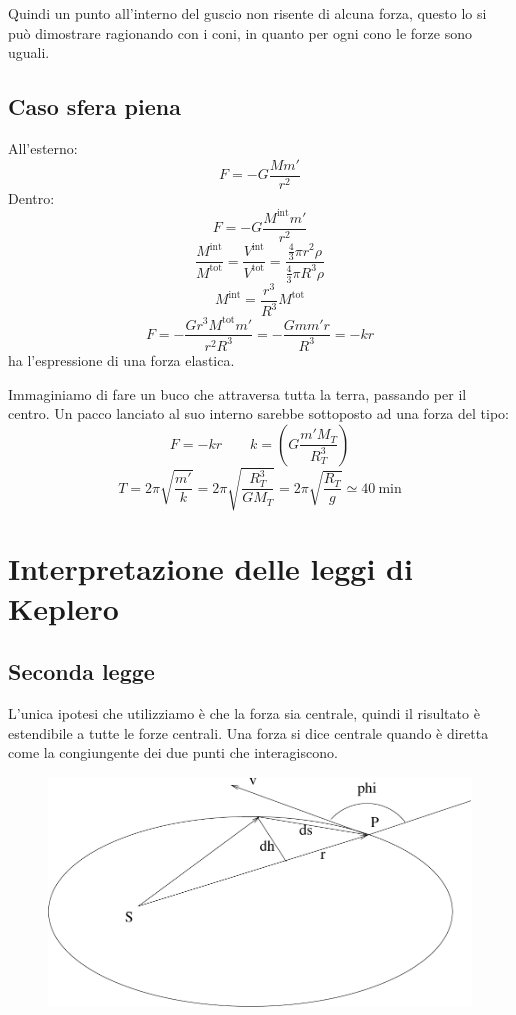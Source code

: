 Quindi un punto all'interno del guscio non risente di alcuna
forza, questo lo si può dimostrare ragionando con i coni, in
quanto per ogni cono le forze sono uguali.
\subsection{Caso sfera piena}
All'esterno:
\[F=-G\frac{Mm'}{r^2}\]
Dentro:
\[F=-G\frac{M^{\text{int}}m'}{r^2}\]
\[\frac{M^{\text{int}}}{M^{\text{tot}}}=\frac{V^{\text{int}}}{V^{\text{tot}}}=\frac{\frac{4}{3}\pi r^2\rho}{\frac{4}{3}\pi R^3\rho}\]
\[M^{\text{int}}=\frac{r^3}{R^3}M^{\text{tot}}\]
\[F=-\frac{Gr^3M^{\text{tot}}m'}{r^2R^3}=-\frac{Gmm'r}{R^3}=-kr\]
ha l'espressione di una forza elastica.

\begin{Es}
  Immaginiamo di fare un buco che attraversa tutta la terra, passando per il centro. Un pacco lanciato al suo interno sarebbe sottoposto ad una forza del tipo:
  \[F=-kr\qquad k=\left(G\frac{m'M_T}{R_T^3}\right)\]
  \[T=2\pi\sqrt{\frac{m'}{k}}=2\pi\sqrt{\frac{R_T^3}{GM_T}}=2\pi\sqrt{\frac{R_T}{g}}\simeq \SI{40}{\minute} \]
\end{Es}
\section{Interpretazione delle leggi di Keplero}
\subsection{Seconda legge}

L'unica ipotesi che utilizziamo è che la forza sia centrale,
quindi il risultato è estendibile a tutte le forze centrali. Una
forza si dice centrale quando è diretta come la congiungente dei
due punti che interagiscono.

\begin{figure}[htbp]
  \centering
  \includegraphics[scale=0.45]{immagini/fisica1/keplero}
\end{figure}



